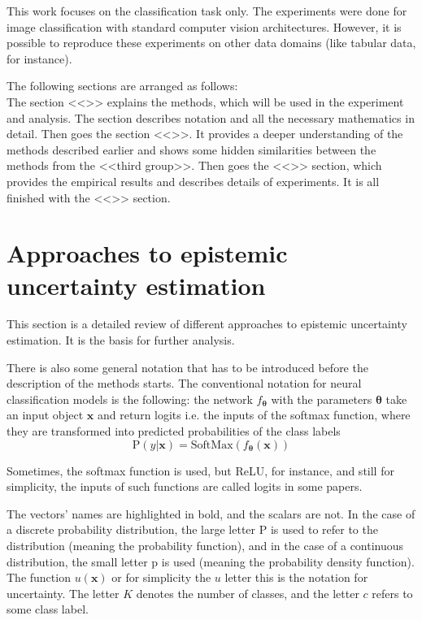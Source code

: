 \documentclass{article}
\begin{document}
This work focuses on the classification task only. The experiments were done for image classification with standard computer vision architectures.
However, it is possible to reproduce these experiments on other data domains (like tabular data, for instance).

The following sections are arranged as follows: \\
The section <<>> explains the methods, which will be used in the experiment and analysis.
The section describes notation and all the necessary mathematics in detail.
Then goes the section <<>>.
It provides a deeper understanding of the methods described earlier and shows some hidden similarities between the methods from the <<third group>>.
Then goes the <<>> section, which provides the empirical results and describes details of experiments.
It is all finished with the <<>> section.

\section{Approaches to epistemic uncertainty estimation}
\label{section:methods_description}
This section is a detailed review of different approaches to epistemic uncertainty estimation. It is the basis for further analysis.

There is also some general notation that has to be introduced before the description of the methods starts.
The conventional notation for neural classification models is the following: the network $f_{\boldsymbol{\theta}}$ with the parameters $\boldsymbol{\theta}$ take an input object $\boldsymbol{x}$ and return logits i.e. the inputs of the softmax function, where they are transformed into predicted probabilities of the class labels
\begin{equation}
\mathrm{P}(y | \boldsymbol{x}) = \mathrm{SoftMax}(f_{\boldsymbol{\theta}}(\boldsymbol{x}))
\end{equation}

Sometimes, the softmax function is used, but ReLU, for instance, and still for simplicity, the inputs of such functions are called logits in some papers.

The vectors' names are highlighted in bold, and the scalars are not.
In the case of a discrete probability distribution, the large letter $\mathrm{P}$ is used to refer to the distribution (meaning the probability function), and in the case of a continuous distribution, the small letter $\mathrm{p}$ is used (meaning the probability density function).
The function $u(\boldsymbol{x})$ or for simplicity the $u$ letter this is the notation for uncertainty.
The letter $K$ denotes the number of classes, and the letter $c$ refers to some class label.
\end{document}
